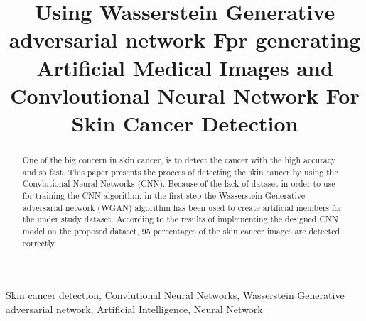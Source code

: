 \documentclass[conference]{IEEEtran}
\begin{document}
\title{Using Wasserstein Generative adversarial network Fpr generating Artificial Medical Images and Convloutional Neural Network For Skin Cancer Detection}

\author{
\and
{}
\and

\and
{}
}

\maketitle

\begin{abstract}
One of the big concern in skin cancer, is to detect the cancer with the high accuracy and so fast. This paper presents the process of detecting the skin cancer by using the Convlutional Neural Networks (CNN). Because of the lack of dataset in order to use for training the CNN algorithm, in the first step the Wasserstein Generative adversarial network (WGAN) algorithm has been used to create artificial members for the under study dataset. According to the results of implementing the designed CNN model on the proposed dataset, 95 percentages of the skin cancer images are detected correctly. 
\end{abstract}

\begin{IEEEkeywords}
Skin cancer detection, Convlutional Neural Networks, Wasserstein Generative adversarial network, Artificial Intelligence, Neural Network
\end{IEEEkeywords}
\end{document}
